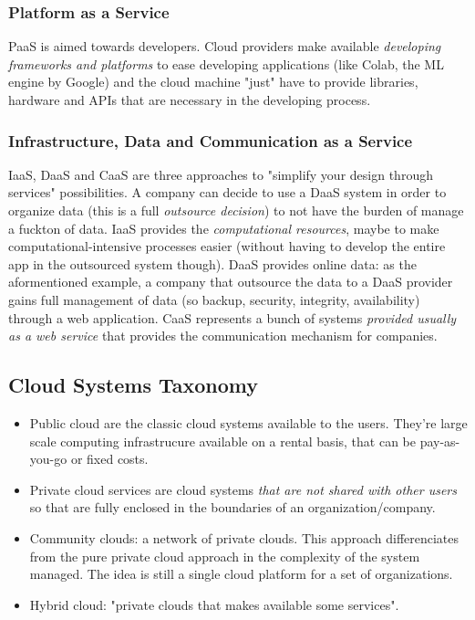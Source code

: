 \documentclass[10pt,a4paper]{article}
\begin{document}
				\subsubsection{Platform as a Service}
					PaaS is aimed towards developers. Cloud providers make available \emph{developing frameworks and platforms} to ease developing applications (like Colab, the ML engine by Google) and the cloud machine "just" have to provide libraries, hardware and APIs that are necessary in the developing process.
				
				\subsubsection{Infrastructure, Data and Communication as a Service}
					IaaS, DaaS and CaaS are three approaches to "simplify your design through services" possibilities. A company can decide to use a DaaS system in order to organize data (this is a full \emph{outsource decision}) to not have the burden of manage a fuckton of data. IaaS provides the \emph{computational resources}, maybe to make computational-intensive processes easier (without having to develop the entire app in the outsourced system though). DaaS provides online data: as the aformentioned example, a company that outsource the data to a DaaS provider gains full management of data (so backup, security, integrity, availability) through a web application. CaaS represents a bunch of systems \emph{provided usually as a web service} that provides the communication mechanism for companies. 
				
			\subsection{Cloud Systems Taxonomy}
				\begin{itemize}
					\item Public cloud are the classic cloud systems available to the users. They're large scale computing infrastrucure available on a rental basis, that can be pay-as-you-go or fixed costs.
					\item Private cloud services are cloud systems \emph{that are not shared with other users} so that are fully enclosed in the boundaries of an organization/company.
					\item Community clouds: a network of private clouds. This approach differenciates from the pure private cloud approach in the complexity of the system managed. The idea is still a single cloud platform for a set of organizations.
					\item Hybrid cloud: "private clouds that makes available some services".
				\end{itemize}
				
\end{document}
